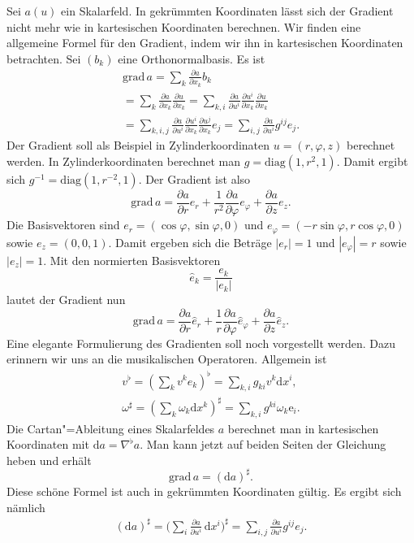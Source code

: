 \documentclass[a4paper,11pt,fleqn,twocolumn,twoside]{scrartcl}
\numberwithin{equation}{section}
\begin{document}
Sei $a(u)$ ein Skalarfeld. In gekrümmten Koordinaten lässt sich
der Gradient nicht mehr wie in kartesischen Koordinaten berechnen.
Wir finden eine allgemeine Formel für den Gradient, indem wir ihn in
kartesischen Koordinaten betrachten. Sei $(b_k)$ eine
Orthonormalbasis. Es ist
\begin{gather*}\mathrm{grad}\,a
= \sum_{k}\frac{\partial a}{\partial x_k}b_k\\
= \sum_{k}\frac{\partial a}{\partial x_k}\frac{\partial u}{\partial x_k}
= \sum_{k,i}\frac{\partial a}{\partial u^i}\frac{\partial u^i}{\partial x_k}
\frac{\partial u}{\partial x_k}\\
= \sum_{k,i,j}\frac{\partial a}{\partial u^i}\frac{\partial u^i}{\partial x_k}
\frac{\partial u^j}{\partial x_k}e_j
= \sum_{i,j}\frac{\partial a}{\partial u^i} g^{ij}e_j.
\end{gather*}
%
Der Gradient soll als Beispiel in Zylinderkoordinaten
$u=(r,\varphi,z)$ berechnet werden. In Zylinderkoordinaten
berechnet man $g = \mathrm{diag}(1,r^2,1)$. Damit ergibt sich
$g^{-1} = \mathrm{diag}(1,r^{-2},1)$. Der Gradient ist also
\begin{equation}
\mathrm{grad}\,a = \frac{\partial a}{\partial r} e_r
+\frac{1}{r^2}\frac{\partial a}{\partial \varphi} e_\varphi
+\frac{\partial a}{\partial z} e_z.
\end{equation}
Die Basisvektoren sind $e_r=(\cos\varphi,\sin\varphi,0)$
und $e_\varphi = (-r\sin\varphi,r\cos\varphi,0)$
sowie $e_z=(0,0,1)$. Damit ergeben sich die Beträge $|e_r|=1$
und $|e_\varphi|=r$ sowie $|e_z|=1$. Mit den normierten
Basisvektoren
\begin{equation}
\hat e_k = \frac{e_k}{|e_k|}
\end{equation}
lautet der Gradient nun
\begin{equation}
\mathrm{grad}\,a = \frac{\partial a}{\partial r} \hat e_r
+\frac{1}{r}\frac{\partial a}{\partial \varphi}\hat e_\varphi
+\frac{\partial a}{\partial z} \hat e_z.
\end{equation}
%
Eine elegante Formulierung des Gradienten soll noch vorgestellt
werden. Dazu erinnern wir uns an die musikalischen Operatoren.
Allgemein ist
\begin{gather*}
v^\flat = (\sum_k v^k e_k)^\flat
= \sum_{k,i} g_{ki}v^k\mathrm dx^i,\\
\omega^\sharp = (\sum_k \omega_k\mathrm dx^k)^\sharp
= \sum_{k,i} g^{ki}\omega_k\mathrm e_i.
\end{gather*}
Die Cartan"=Ableitung eines Skalarfeldes $a$ berechnet man in
kartesischen Koordinaten mit
$\mathrm da = \nabla^\flat a$. 
Man kann jetzt auf beiden Seiten der Gleichung heben und erhält
\begin{equation}
\mathrm{grad}\,a = (\mathrm da)^\sharp.
\end{equation}
Diese schöne Formel ist auch in gekrümmten Koordinaten gültig.
Es ergibt sich nämlich
\begin{gather*}
(\mathrm da)^\sharp
= \Big(\sum_i \frac{\partial a}{\partial u^i}
\,\mathrm dx^i\Big)^\sharp
= \sum_{i,j} \frac{\partial a}{\partial u^i}g^{ij}e_j.
\end{gather*}
\end{document}
